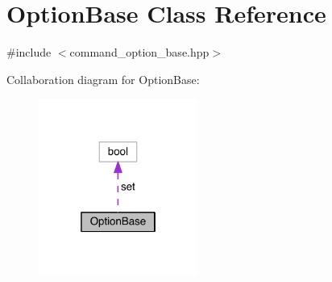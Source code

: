 \hypertarget{class_option_base}{}\section{Option\+Base Class Reference}
\label{class_option_base}


{\ttfamily \#include $<$command\+\_\+option\+\_\+base.\+hpp$>$}



Collaboration diagram for Option\+Base\+:
\nopagebreak
\begin{figure}[H]
\begin{center}
\leavevmode
\includegraphics[width=148pt]{class_option_base__coll__graph}
\end{center}
\end{figure}

